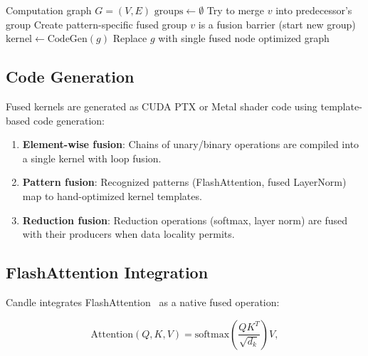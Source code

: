 \documentclass[11pt,twocolumn]{article}
\begin{document}
\begin{algorithm}[H]
\caption{Kernel Fusion Pass}
\label{alg:fusion}
\begin{algorithmic}[1]
\Require Computation graph $G = (V, E)$
\State $\text{groups} \gets \emptyset$
\State {}
        \State Try to merge $v$ into predecessor's group
        \State Create pattern-specific fused group
    \Else
        \State $v$ is a fusion barrier (start new group)
    \EndIf
\EndFor
\State {}
        \State $\text{kernel} \gets \text{CodeGen}(g)$ 
        \State Replace $g$ with single fused node
    \EndIf
\EndFor
\State \Return optimized graph
\end{algorithmic}
\end{algorithm}

\subsection{Code Generation}

Fused kernels are generated as CUDA PTX or Metal shader code using template-based code generation:

\begin{enumerate}[leftmargin=1.4em]
    \item \textbf{Element-wise fusion}: Chains of unary/binary operations are compiled into a single kernel with loop fusion.
    \item \textbf{Pattern fusion}: Recognized patterns (FlashAttention, fused LayerNorm) map to hand-optimized kernel templates.
    \item \textbf{Reduction fusion}: Reduction operations (softmax, layer norm) are fused with their producers when data locality permits.
\end{enumerate}

\subsection{FlashAttention Integration}

Candle integrates FlashAttention~\cite{dao2022flashattention,dao2023flashattention2} as a native fused operation:

\begin{equation}
\text{Attention}(Q, K, V) = \text{softmax}\left(\frac{QK^T}{\sqrt{d_k}}\right)V,
\end{equation}
\end{document}
